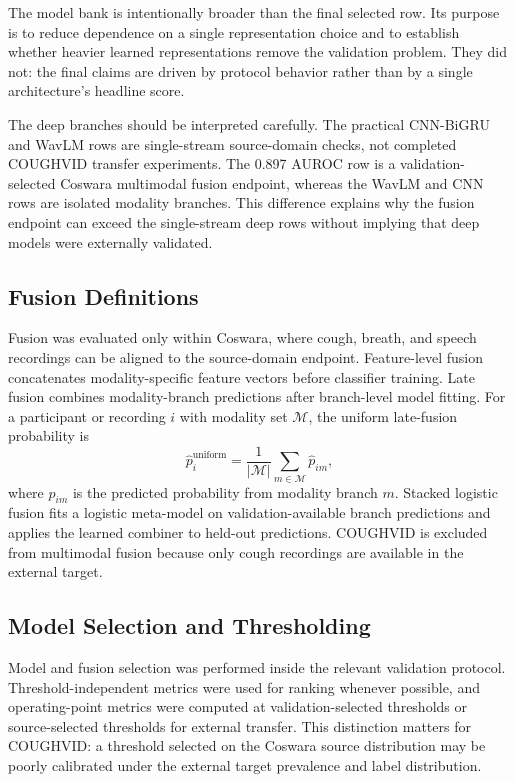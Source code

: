 \documentclass[journal]{IEEEtran}
\begin{document}
The model bank is intentionally broader than the final selected row. Its purpose is to reduce dependence on a single representation choice and to establish whether heavier learned representations remove the validation problem. They did not: the final claims are driven by protocol behavior rather than by a single architecture's headline score.

The deep branches should be interpreted carefully. The practical CNN-BiGRU and WavLM rows are single-stream source-domain checks, not completed COUGHVID transfer experiments. The 0.897 AUROC row is a validation-selected Coswara multimodal fusion endpoint, whereas the WavLM and CNN rows are isolated modality branches. This difference explains why the fusion endpoint can exceed the single-stream deep rows without implying that deep models were externally validated.

\subsection{Fusion Definitions}
Fusion was evaluated only within Coswara, where cough, breath, and speech recordings can be aligned to the source-domain endpoint. Feature-level fusion concatenates modality-specific feature vectors before classifier training. Late fusion combines modality-branch predictions after branch-level model fitting. For a participant or recording $i$ with modality set $\mathcal{M}$, the uniform late-fusion probability is
\begin{equation}
\hat{p}_{i}^{\mathrm{uniform}} =
\frac{1}{|\mathcal{M}|}\sum_{m \in \mathcal{M}}\hat{p}_{im},
\end{equation}
where $\hat{p}_{im}$ is the predicted probability from modality branch $m$. Stacked logistic fusion fits a logistic meta-model on validation-available branch predictions and applies the learned combiner to held-out predictions. COUGHVID is excluded from multimodal fusion because only cough recordings are available in the external target.

\subsection{Model Selection and Thresholding}
Model and fusion selection was performed inside the relevant validation protocol. Threshold-independent metrics were used for ranking whenever possible, and operating-point metrics were computed at validation-selected thresholds or source-selected thresholds for external transfer. This distinction matters for COUGHVID: a threshold selected on the Coswara source distribution may be poorly calibrated under the external target prevalence and label distribution.
\end{document}
